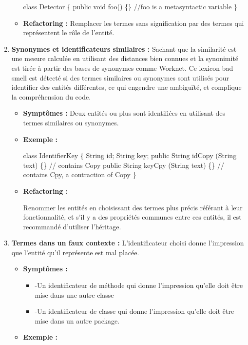 \begin{enumerate}
\begin{itemize}
\begin{framed}
 {\selectfont
class Detector \{ \newline
	public void foo() \{\} //foo is a metasyntactic variable \newline
 \}
 }
 \end{framed}

\item \textbf {Refactoring :}
Remplacer les termes sans signification par des termes qui représentent le rôle de l’entité.
\end{itemize}

\item \textbf {Synonymes et identificateurs similaires :}
Sachant que la similarité est une mesure calculée en utilisant des distances bien connues et la synonimité est tirée à partir des bases de synonymes comme Worknet. Ce lexicon bad smell est détecté si des termes similaires ou synonymes sont utilisés pour identifier des entités différentes, ce qui engendre une ambiguïté, et complique la compréhension du code.
\begin{itemize}
\item \textbf {Symptômes :}
Deux entités ou plus sont identifiées en utilisant des termes similaires ou synonymes.
\item \textbf {Exemple :}
\begin{framed}
    {\selectfont

class IdentifierKey \{ \newline
   String id;\newline
   String key;\newline
   public String idCopy (String text) \{\} // contains Copy\newline
   public String keyCpy (String text) \{\} // contains Cpy, a contraction of Copy\newline
\} 
 }
 \end{framed}
\item \textbf {Refactoring :}

Renommer les entités en choisissant des termes plus précis référant à leur fonctionnalité, et s'il y a des propriétés communes entre ces entités, il est recommandé d’utiliser l’héritage.
\end{itemize}
\item \textbf {Termes dans un faux contexte :}
L’identificateur choisi donne l’impression que l’entité qu’il représente est mal placée.
\begin{itemize}
\item \textbf {Symptômes :}
\begin{itemize}
\item -Un identificateur de méthode qui donne l’impression qu’elle doit être mise dans une autre classe
\item -Un identificateur de classe qui donne l’impression qu’elle doit être mise dans un autre package.
\end{itemize}
\item \textbf {Exemple :}
\begin{framed}
   {\selectfont 

}
\end{framed}
\end{itemize}
\end{enumerate}
